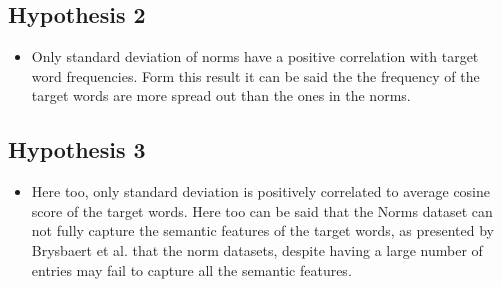 \documentclass[11pt,a4paper]{article}
\begin{document}
\subsection{Hypothesis 2}
\begin{itemize}
	\item Only standard deviation of norms have a positive correlation with target word frequencies. Form this result it can be said the the frequency of the target words are more spread out than the ones in the norms.
\end{itemize}

\subsection{Hypothesis 3}
\begin{itemize}
	\item Here too, only standard deviation is positively correlated to average cosine score of the target words. Here too can be said that the Norms dataset can not fully capture the semantic features of the target words, as presented by Brysbaert et al. \citep{brys} that the norm datasets, despite having a large number of entries may fail to capture all the semantic features.
\end{itemize}





\end{document}
